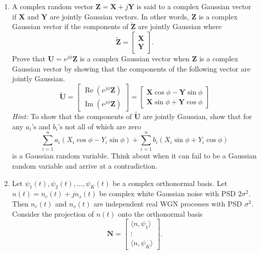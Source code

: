 \documentclass[10pt]{report}
\renewcommand\Re{\operatorname{Re}}
\renewcommand\Im{\operatorname{Im}}
\begin{document}
\begin{enumerate}
  \item A complex random vector $\mathbf{Z} = \mathbf{X}+j\mathbf{Y}$ is said to a complex Gaussian vector if $\mathbf{X}$ and $\mathbf{Y}$ are jointly Gaussian vectors. In other words, $\mathbf{Z}$ is a complex Gaussian vector if the components of $\tilde{\mathbf{Z}}$ are jointly Gaussian where 
  \begin{equation*}
    \tilde{\mathbf{Z}} = \begin{bmatrix} \mathbf{X} \\ \mathbf{Y}\end{bmatrix}.
  \end{equation*}
  Prove that $\mathbf{U} = e^{j\phi}\mathbf{Z}$ is a complex Gaussian vector when $\mathbf{Z}$ is a complex Gaussian vector by showing that the components of the following vector are jointly Gaussian.
  \begin{equation*}
    \tilde{\mathbf{U}} = \begin{bmatrix} \Re(e^{j\phi}\mathbf{Z}) \\ \Im(e^{j\phi}\mathbf{Z})\end{bmatrix} = \begin{bmatrix} \mathbf{X}\cos \phi - \mathbf{Y}\sin\phi \\ \mathbf{X}\sin\phi + \mathbf{Y}\cos\phi\end{bmatrix}
  \end{equation*}
  \textit{Hint:} To show that the components of $\tilde{\mathbf{U}}$ are jointly Gaussian, show that for any $a_i$'s and $b_i$'s not all of which are zero 
  \begin{equation*}
    \sum_{i=1}^n a_i (X_i\cos\phi-Y_i\sin\phi) + \sum_{i=1}^n b_i (X_i\sin\phi+Y_i\cos\phi)
  \end{equation*}
  is a Gaussian random variable. Think about when it can fail to be a Gaussian random variable and arrive at a contradiction.
  \item Let $\psi_1(t), \psi_2(t),\ldots,\psi_K(t)$ be a complex orthonormal basis. Let $n(t) = n_c(t)+jn_s(t)$ be complex white Gaussian noise with PSD $2\sigma^2$. Then $n_c(t)$ and $n_s(t)$ are independent real WGN processes with PSD $\sigma^2$. Consider the projection of $n(t)$ onto the orthonormal basis
  \begin{equation*}
    \mathbf{N} = \begin{bmatrix} \langle n, \psi_1 \rangle \\ \vdots \\ \langle n, \psi_K \rangle \end{bmatrix}.

\end{equation*}
\end{enumerate}
\end{document}

